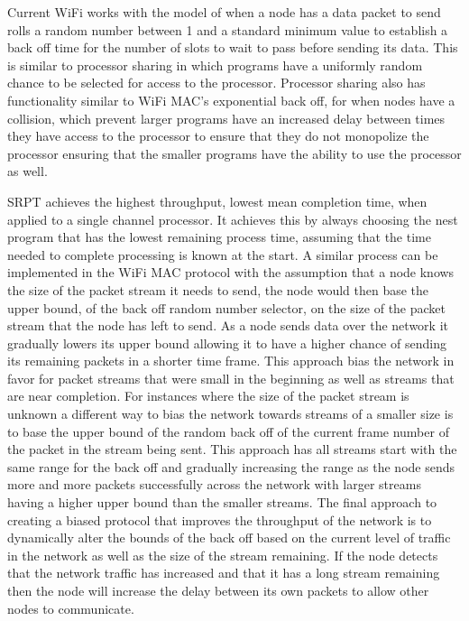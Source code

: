 \documentclass{sigcomm-alternate}
\begin{document}

Current WiFi works with the model of when a node has a data packet to send rolls a random number between 1 and a standard minimum value to establish a back off time for the number of slots to wait to pass before sending its data. This is similar to processor sharing in which programs have a uniformly random chance to be selected for access to the processor. Processor sharing also has functionality similar to WiFi MAC's exponential back off, for when nodes have a collision, which prevent larger programs have an increased delay between times they have access to the processor to ensure that they do not monopolize the processor ensuring that the smaller programs have the ability to use the processor as well.


SRPT achieves the highest throughput, lowest mean completion time, when applied to a single channel processor\cite{schrage}. It achieves this by always choosing the nest program that has the lowest remaining process time, assuming that the time needed to complete processing is known at the start. A similar process can be implemented in the WiFi MAC protocol with the assumption that a node knows the size of the packet stream it needs to send, the node would then base the upper bound, of the back off random number selector, on the size of the packet stream that the node has left to send. As a node sends data over the network it gradually lowers its upper bound allowing it to have a higher chance of sending its remaining packets in a shorter time frame. This approach bias the network in favor for packet streams that were small in the beginning as well as streams that are near completion. For instances where the size of the packet stream is unknown a different way to bias the network towards streams of a smaller size is to base the upper bound of the random back off of the current frame number of the packet in the stream being sent. This approach has all streams start with the same range for the back off and gradually increasing the range as the node sends more and more packets successfully across the network with larger streams having a higher upper bound than the smaller streams. The final approach to creating a biased protocol that improves the throughput of the network is to dynamically alter the bounds of the back off based on the current level of traffic in the network as well as the size of the stream remaining. If the node detects that the network traffic has increased and that it has a long stream remaining then the node will increase the delay between its own packets to allow other nodes to communicate.
\end{document}
